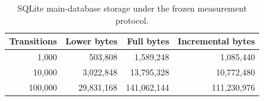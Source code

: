 \begin{table}[t]
\centering
\caption{SQLite main-database storage under the frozen measurement protocol.}
\label{tab:storage-cost}
\begin{tabular}{rrrr}
\toprule
Transitions & Lower bytes & Full bytes & Incremental bytes \\
\midrule
1,000 & 503,808 & 1,589,248 & 1,085,440 \\
10,000 & 3,022,848 & 13,795,328 & 10,772,480 \\
100,000 & 29,831,168 & 141,062,144 & 111,230,976 \\
\bottomrule
\end{tabular}
\end{table}
